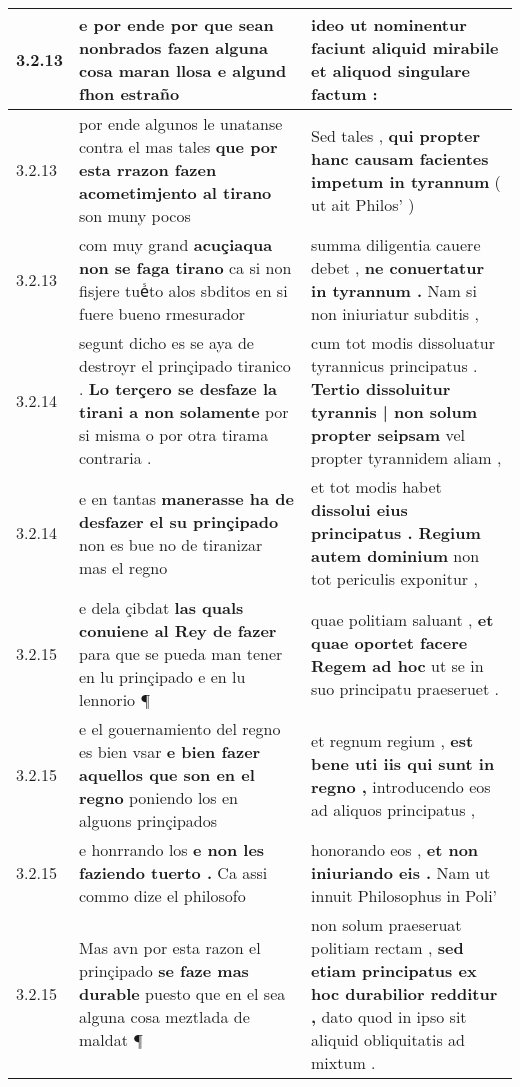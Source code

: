 \begin{tabular}{|p{1cm}|p{6.5cm}|p{6.5cm}|}
3.2.13 & e por ende por que sean nonbrados \textbf{ fazen alguna cosa maran llosa } e algund fhon estraño & ideo ut nominentur \textbf{ faciunt aliquid mirabile } et aliquod singulare factum : \\\hline
3.2.13 & por ende algunos le unatanse contra el mas tales \textbf{ que por esta rrazon fazen acometimjento al tirano } son muny pocos & Sed tales , \textbf{ qui propter hanc causam facientes impetum in tyrannum } ( ut ait Philos’ ) \\\hline
3.2.13 & com muy grand \textbf{ acuçiaqua non se faga tirano } ca si non fisjere tueᷤto alos sbditos en si fuere bueno rmesurador & summa diligentia cauere debet , \textbf{ ne conuertatur in tyrannum . } Nam si non iniuriatur subditis , \\\hline
3.2.14 & segunt dicho es se aya de destroyr el prinçipado tiranico . \textbf{ Lo terçero se desfaze la tirani a non solamente } por si misma o por otra tirama contraria . & cum tot modis dissoluatur tyrannicus principatus . \textbf{ Tertio dissoluitur tyrannis | non solum propter seipsam } vel propter tyrannidem aliam , \\\hline
3.2.14 & e en tantas \textbf{ manerasse ha de desfazer el su prinçipado } non es bue no de tiranizar mas el regno & et tot modis habet \textbf{ dissolui eius principatus . Regium autem dominium } non tot periculis exponitur , \\\hline
3.2.15 & e dela çibdat \textbf{ las quals conuiene al Rey de fazer } para que se pueda man tener en lu prinçipado e en lu lennorio ¶ & quae politiam saluant , \textbf{ et quae oportet facere Regem ad hoc } ut se in suo principatu praeseruet . \\\hline
3.2.15 & e el gouernamiento del regno es bien vsar \textbf{ e bien fazer aquellos que son en el regno } poniendo los en alguons prinçipados & et regnum regium , \textbf{ est bene uti iis qui sunt in regno , } introducendo eos ad aliquos principatus , \\\hline
3.2.15 & e honrrando los \textbf{ e non les faziendo tuerto . } Ca assi commo dize el philosofo & honorando eos , \textbf{ et non iniuriando eis . } Nam ut innuit Philosophus in Poli’ \\\hline
3.2.15 & Mas avn por esta razon el prinçipado \textbf{ se faze mas durable } puesto que en el sea alguna cosa meztlada de maldat ¶ & non solum praeseruat politiam rectam , \textbf{ sed etiam principatus ex hoc durabilior redditur , } dato quod in ipso sit aliquid obliquitatis ad mixtum . \\\hline

\end{tabular}
